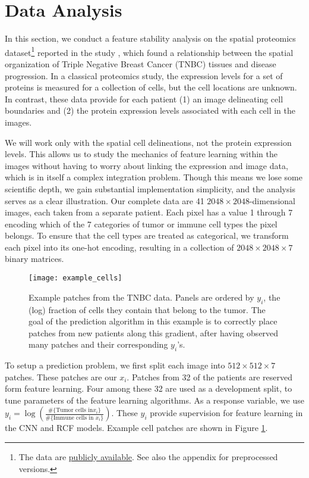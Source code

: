 
\section{Data Analysis}
\label{sec:dataset}

In this section, we conduct a feature stability analysis on the spatial
proteomics dataset\footnote{The data are
  \href{https://www.angelolab.com/mibi-data}{publicly available}. See also the
  appendix for preprocessed versions.} reported in the study
\citep{keren2018structured}, which found a relationship between the spatial
organization of Triple Negative Breast Cancer (TNBC) tissues and disease
progression. In a classical proteomics study, the expression levels for a set of
proteins is measured for a collection of cells, but the cell locations are
unknown. In contrast, these data provide for each patient (1) an image
delineating cell boundaries and (2) the protein expression levels associated
with each cell in the images.

We will work only with the spatial cell delineations, not the protein expression
levels. This allows us to study the mechanics of feature learning within the
images without having to worry about linking the expression and image data,
which is in itself a complex integration problem. Though this means we lose some
scientific depth, we gain substantial implementation simplicity, and the
analysis serves as a clear illustration. Our complete data are 41 $2048 \times
2048$-dimensional images, each taken from a separate patient. Each pixel has a
value 1 through 7 encoding which of the 7 categories of tumor or immune cell
types the pixel belongs. To ensure that the cell types are treated as
categorical, we transform each pixel into its one-hot encoding, resulting in a
collection of $2048 \times 2048 \times 7$ binary matrices.

\begin{figure}
  \centering
  \texttt{[image: example\_cells]}
  \caption{Example patches from the TNBC data. Panels are ordered by $y_i$, the
    (log) fraction of cells they contain that belong to the tumor. The goal of
    the prediction algorithm in this example is to correctly place patches from
    new patients along this gradient, after having observed many patches and
    their corresponding $y_i$'s.}
  \label{fig:example_cells}
\end{figure}

To setup a prediction problem, we first split each image into $512 \times 512 \times 7$
patches. These patches are our $x_{i}$. Patches from 32 of the patients are
reserved form feature learning. Four among these 32 are used as a development
split, to tune parameters of the feature learning algorithms. As a response
variable, we use $y_{i} = \log\left(\frac{\#\{\text{Tumor cells in
}x_{i}\}}{\#\{\text{Immune cells in }x_i\}}\right)$. These $y_i$ provide
supervision for feature learning in the CNN and RCF models. Example cell patches
are shown in Figure \ref{fig:example_cells}.

